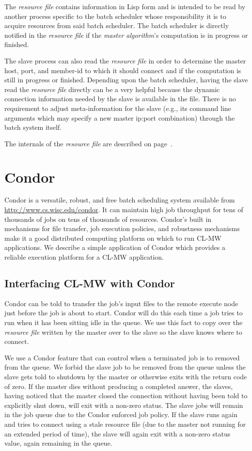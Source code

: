 \documentclass[titlepage,12pt]{book}
\newcommand{\xsmall}{\latexhtml{\small}{}}
\newcommand{\xnormalsize}{\latexhtml{\normalsize}{}}
\newcommand{\clmw}{\xsmall\textsc{CL-MW}\xnormalsize\xspace}
\newcommand{\ma}{\textit{master algorithm}\xspace}
\newcommand{\rfile}{\textit{resource file}\xspace}
\begin{document}
The \rfile contains information in Lisp form and is intended to be read by
another process specific to the batch scheduler whose responsibility it
is to acquire resources from said batch scheduler. The batch scheduler
is directly notified in the \rfile if the {\ma}'s computation is in
progress or finished.

The slave process can also read the \rfile in order to determine the
master host, port, and member-id to which it should connect and if
the computation is still in progress or finished.  Depending upon the
batch scheduler, having the slave read the \rfile directly can be a
very helpful because the dynamic connection information needed by the
slave is available in the file. There is no requirement to adjust
meta-information for the slave (e.g., its command line arguments
which may specify a new master ip:port combination) through the batch
system itself.

The internals of the \rfile are described on
page~\pageref{resource-file}.

\section{Condor}

Condor is a versatile, robust, and free batch scheduling system
available from \url{http://www.cs.wisc.edu/condor}. It can maintain
high job throughput for tens of thousands of jobs on tens of thousands
of resources. Condor's built in mechanisms for file transfer,
job execution policies, and robustness mechanisms make it a good
distributed computing platform on which to run \clmw applications.
We describe a simple application of Condor which provides a reliable
execution platform for a \clmw application.

\subsection{Interfacing \clmw with Condor}

Condor can be told to transfer the job's input files to the remote
execute node just before the job is about to start. Condor will do
this each time a job tries to run when it has been sitting idle in
the queue. We use this fact to copy over the \rfile written by the
master over to the slave so the slave knows where to connect.

We use a Condor feature that can control when a terminated job is
to removed from the queue. We forbid the slave job to be removed
from the queue unless the slave gets told to shutdown by the master
or otherwise exits with the return code of zero.  If the master dies
without producing a completed answer, the slaves, having noticed that
the master closed the connection without having been told to explicitly
shut down, will exit with a non-zero status. The slave jobs will remain
in the job queue due to the Condor enforced job policy. If the slave
runs again and tries to connect using a stale resource file (due to
the master not running for an extended period of time), the slave will
again exit with a non-zero status value, again remaining in the queue.
\end{document}
